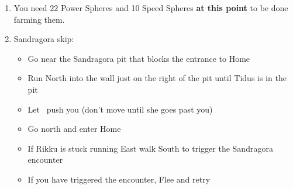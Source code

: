 \begin{enumerate}[resume]
    \blitzballdetermination[true]{%
        \item \formation{\tidus}{\lulu}{\auron}
    }{%
        \item \formation{\tidus}{\rikku}{\auron}
    }
    \item You need 22 Power Spheres and 10 Speed Spheres \textbf{at this point} to be done farming them.
    \item Sandragora skip:
    \begin{itemize}
        \item Go near the Sandragora pit that blocks the entrance to Home
        \item Run North into the wall just on the right of the pit until Tidus is in the pit
        \item Let \rikku\ push you (don't move until she goes past you)
        \item Go north and enter Home
        \item If Rikku is stuck running East walk South to trigger the Sandragora encounter
        \item If you have triggered the encounter, Flee and retry
    \end{itemize}
\end{enumerate}
\bothcb\winnpsingle\lossnpsingle
